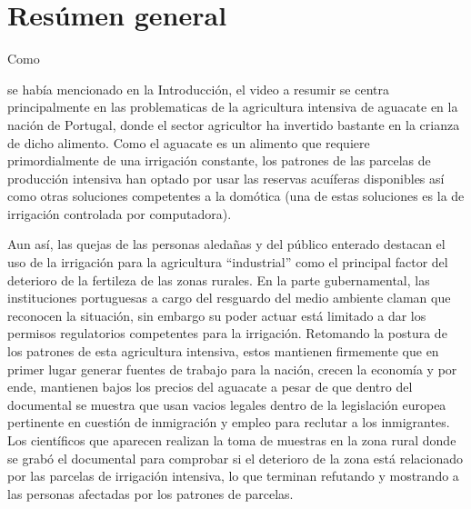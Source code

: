 \documentclass[stu, 12pt, letterpaper, donotrepeattitle, floatsintext, natbib]{apa7}
\begin{document}
\section{Resúmen general}
Como \begin{justifying}
se había mencionado en la Introducción, el video a resumir se centra principalmente en las problematicas de la agricultura intensiva de aguacate en la nación de Portugal, donde el sector agricultor
ha invertido bastante en la crianza de dicho alimento. Como el aguacate es un alimento que requiere primordialmente de una irrigación constante, los patrones de las parcelas de producción intensiva
han optado por usar las reservas acuíferas disponibles así como otras soluciones competentes a la domótica (una de estas soluciones es la de irrigación controlada por computadora).\par
\vspace{\baselineskip}
Aun así, las quejas de las personas aledañas y del público enterado destacan el uso de la irrigación para la agricultura ``industrial'' como el principal factor del deterioro de la fertileza de las zonas rurales. En la parte gubernamental,
las instituciones portuguesas a cargo del resguardo del medio ambiente claman que reconocen la situación, sin embargo su poder actuar está limitado a dar los permisos regulatorios competentes para la irrigación.
Retomando la postura de los patrones de esta agricultura intensiva, estos mantienen firmemente que en primer lugar generar fuentes de trabajo para la nación, crecen la economía y por ende, mantienen bajos los precios
del aguacate a pesar de que dentro del documental se muestra que usan vacios legales dentro de la legislación europea pertinente en cuestión de inmigración y empleo para reclutar a los inmigrantes.
Los científicos que aparecen realizan la toma de muestras en la zona rural donde se grabó el documental para comprobar si el deterioro de la zona está relacionado por las parcelas de irrigación intensiva, lo que terminan
refutando y mostrando a las personas afectadas por los patrones de parcelas.\par
\vspace{\baselineskip}
\end{justifying}
\end{document}
